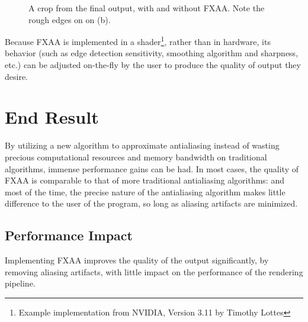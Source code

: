 \documentclass[11pt, oneside]{report}
\begin{document}
\begin{figure}[!htbp]
  \centering
  \hfill
  \caption{A crop from the final output, with and without FXAA. Note the rough edges on on (b).}
\end{figure}

Because \gls{FXAA} is implemented in a shader\footnote{Example implementation from NVIDIA, Version 3.11 by Timothy Lottes}, rather than in hardware, its behavior (such as edge detection sensitivity, smoothing algorithm and sharpness, etc.) can be adjusted on-the-fly by the user to produce the quality of output they desire.

\section{End Result}
By utilizing a new algorithm to approximate antialiasing instead of wasting precious computational resources and \gls{memory bandwidth} on traditional algorithms, immense performance gains can be had. In most cases, the quality of \gls{FXAA} is comparable to that of more traditional antialiasing algorithms: and most of the time, the precise nature of the antialiasing algorithm makes little difference to the user of the program, so long as \gls{aliasing} artifacts are minimized.

\subsection{Performance Impact}
Implementing \gls{FXAA} improves the quality of the output significantly, by removing \gls{aliasing} artifacts, with little impact on the performance of the rendering pipeline.
\end{document}
